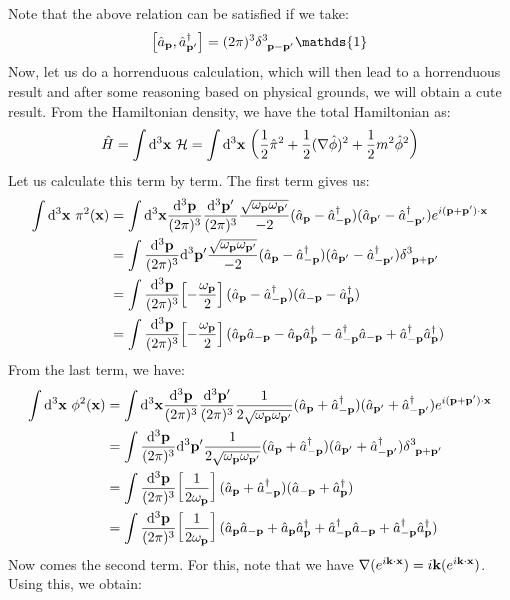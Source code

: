 Note that the above relation can be satisfied if we take:
$$\comtr{\ann{\vb{p}}}{\cre{\vb{p}'}}= (2\pi)^3\delt{3}{\vb{p}-\vb{p}'}\mathds{1}$$
Now, let us do a horrenduous calculation, which will then lead to a horrenduous result and after some reasoning based on physical grounds, we will obtain a cute result. From the Hamiltonian density, we have the total Hamiltonian as:
$$\hat{H} = \int\dd^3\vb{x} \ \mathcal H = \int \dd^3\vb{x} \ \qty(\frac{1}{2}\hat{\pi}^2 + \frac{1}{2}(\nabla \hat{\phi})^2 + \frac{1}{2}m^2\hat{\phi}^2)$$
Let us calculate this term by term. The first term gives us:
\begin{align*}
    \int \dd^3\vb{x} \ \pi^2(\vb{x}) &=  \int \dd^3\vb{x}\meas{\vb{\vb{p}}}\meas{\vb{p}'}\frac{\sqrt{\omp \ompd}}{-2} (\ann{\tvec{p}}-\cre{\tvec{-p}})(\ann{\tvec{p}'}-\cre{\tvec{-p}'}) e^{i(\vb{p}+\vb{p}')\cdot \vb{x}}\\
    &= \int \meas{\vb{\vb{p}}}\dd^3\vb{p}'\frac{\sqrt{\omp \ompd}}{-2} (\ann{\tvec{p}}-\cre{\tvec{-p}})(\ann{\tvec{p}'}-\cre{\tvec{-p}'}) \delt{3}{\vb{p}+\vb{p}'}\\
    &=\int \meas{\vb{\vb{p}}}\qty[-\frac{\omp}{2}] (\ann{\tvec{p}}-\cre{\tvec{-p}})(\ann{\tvec{-p}}-\cre{\tvec{p}}) \\
    &=\int \meas{\vb{\vb{p}}}\qty[-\frac{\omp}{2}] (\annp\annmp -\annp\crep-\cremp\annmp+\cremp\crep)
\end{align*}
From the last term, we have:
\begin{align*}
    \int \dd^3\vb{x} \ \phi^2(\vb{x}) &=  \int \dd^3\vb{x}\meas{\vb{\vb{p}}}\meas{\vb{p}'}\frac{1}{2\sqrt{\omp \ompd}} (\ann{\tvec{p}}+\cre{\tvec{-p}})(\ann{\tvec{p}'}+\cre{\tvec{-p}'}) e^{i(\vb{p}+\vb{p}')\cdot \vb{x}}\\
    &= \int \meas{\vb{\vb{p}}}\dd^3\vb{p}'\frac{1}{2\sqrt{\omp \ompd}} (\ann{\tvec{p}}+\cre{\tvec{-p}})(\ann{\tvec{p}'}+\cre{\tvec{-p}'}) \delt{3}{\vb{p}+\vb{p}'}\\
    &=\int \meas{\vb{\vb{p}}}\qty[\frac{1}{2\omp}] (\ann{\tvec{p}}+\cre{\tvec{-p}})(\ann{\tvec{-p}}+\cre{\tvec{p}}) \\
    &=\int \meas{\vb{\vb{p}}}\qty[\frac{1}{2\omp}] (\annp\annmp +\annp\crep+\cremp\annmp+\cremp\crep)
\end{align*}
Now comes the second term. For this, note that we have $\nabla (e^{i \vb{k}\cdot \vb{x}}) = i\vb{k} (e^{i \vb{k}\cdot \vb{x}})$. Using this, we obtain:

